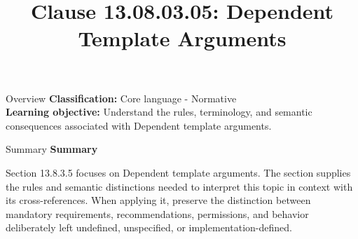 \documentclass[10pt,letterpaper]{article}
\title{Clause 13.08.03.05: Dependent Template Arguments}
\author{}
\date{}
\begin{document}
\maketitle
\begin{CornellOverviewBox}{Overview}
\textbf{Classification:} Core language - Normative\\[2pt]
\textbf{Learning objective:} Understand the rules, terminology, and semantic consequences associated with Dependent template arguments.
\end{CornellOverviewBox}\begin{CornellSummaryBox}{Summary}
{\sffamily\bfseries\color{Accent} Summary}\par\vspace{3pt}Section 13.8.3.5 focuses on Dependent template arguments. The section supplies the rules and semantic distinctions needed to interpret this topic in context with its cross-references. When applying it, preserve the distinction between mandatory requirements, recommendations, permissions, and behavior deliberately left undefined, unspecified, or implementation-defined.
\end{CornellSummaryBox}
\end{document}
